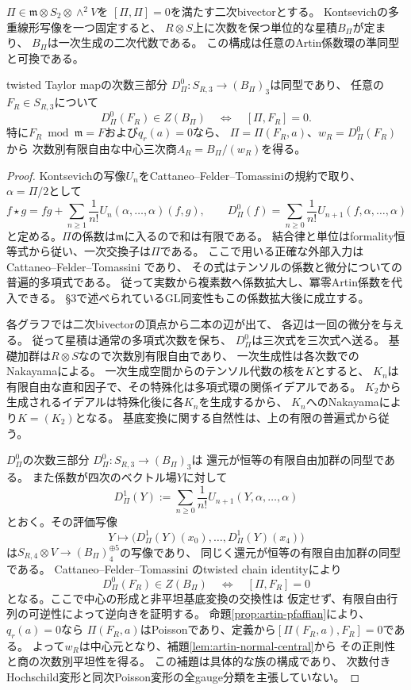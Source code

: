 \begin{lemma}[同次量子化による中心三次商の構成]
\label{lem:artin-homogeneous-casimir-quantization}
$\Pi\in\mathfrak m\otimes S_2\otimes\wedge^2V$を
$[\Pi,\Pi]=0$を満たす二次bivectorとする。
Kontsevichの多重線形写像を一つ固定すると、
$R\otimes S$上に次数を保つ単位的な星積$B_\Pi$が定まり、
$B_\Pi$は一次生成の二次代数である。
この構成は任意のArtin係数環の準同型と可換である。

twisted Taylor mapの次数三部分
$D^0_\Pi:S_{R,3}\to(B_\Pi)_3$は同型であり、
任意の$F_R\in S_{R,3}$について
\[
 D^0_\Pi(F_R)\in Z(B_\Pi)
 \quad\Longleftrightarrow\quad [\Pi,F_R]=0.
\]
特に$F_R\bmod\mathfrak m=F$および$q_r(a)=0$なら、
$\Pi=\Pi(F_R,a)$、$w_R=D^0_\Pi(F_R)$から
次数別有限自由な中心三次商$A_R=B_\Pi/(w_R)$を得る。
\end{lemma}
\begin{proof}
Kontsevichの写像$U_n$をCattaneo--Felder--Tomassiniの規約で取り、
$\alpha=\Pi/2$として
\[
 f\star g=fg+\sum_{n\ge1}\frac1{n!}
 U_n(\alpha,\ldots,\alpha)(f,g),\qquad
 D^0_\Pi(f)=\sum_{n\ge0}\frac1{n!}
 U_{n+1}(f,\alpha,\ldots,\alpha)
\]
と定める。$\Pi$の係数は$\mathfrak m$に入るので和は有限である。
結合律と単位はformality恒等式から従い、一次交換子は$\Pi$である。
ここで用いる正確な外部入力はCattaneo--Felder--Tomassini
\cite[\S3, Theorem~3.1, Proposition~3.3]{CFT}であり、
その式はテンソルの係数と微分についての普遍的多項式である。
従って実数から複素数へ係数拡大し、冪零Artin係数を代入できる。
\S3で述べられているGL同変性もこの係数拡大後に成立する。

各グラフでは二次bivectorの頂点から二本の辺が出て、
各辺は一回の微分を与える。
従って星積は通常の多項式次数を保ち、
$D^0_\Pi$は三次式を三次式へ送る。
基礎加群は$R\otimes S$なので次数別有限自由であり、
一次生成性は各次数でのNakayamaによる。
一次生成空間からのテンソル代数の核を$K$とすると、
$K_n$は有限自由な直和因子で、その特殊化は多項式環の関係イデアルである。
$K_2$から生成されるイデアルは特殊化後に各$K_n$を生成するから、
$K_n$へのNakayamaにより$K=(K_2)$となる。
基底変換に関する自然性は、上の有限の普遍式から従う。

$D^0_\Pi$の次数三部分
$D^0_\Pi:S_{R,3}\to(B_\Pi)_3$は
還元が恒等の有限自由加群の同型である。
また係数が四次のベクトル場$Y$に対して
\[
 D^1_\Pi(Y):=\sum_{n\ge0}\frac1{n!}
 U_{n+1}(Y,\alpha,\ldots,\alpha)
\]
とおく。その評価写像
\[
 Y\longmapsto
 \bigl(D^1_\Pi(Y)(x_0),\ldots,D^1_\Pi(Y)(x_4)\bigr)
\]
は$S_{R,4}\otimes V\to(B_\Pi)_4^{\oplus5}$の写像であり、
同じく還元が恒等の有限自由加群の同型である。
Cattaneo--Felder--Tomassini
\cite[Corollary~5.2(iv)]{CFT}のtwisted chain identityにより
\[
 D^0_\Pi(F_R)\in Z(B_\Pi)
 \quad\Longleftrightarrow\quad [\Pi,F_R]=0
\]
となる。ここで中心の形成と非平坦基底変換の交換性は
仮定せず、有限自由行列の可逆性によって逆向きを証明する。
命題\ref{prop:artin-pfaffian}により、$q_r(a)=0$なら
$\Pi(F_R,a)$はPoissonであり、定義から$[\Pi(F_R,a),F_R]=0$である。
よって$w_R$は中心元となり、補題\ref{lem:artin-normal-central}から
その正則性と商の次数別平坦性を得る。
この補題は具体的な族の構成であり、
次数付きHochschild変形と同次Poisson変形の全gauge分類を主張していない。
\end{proof}

